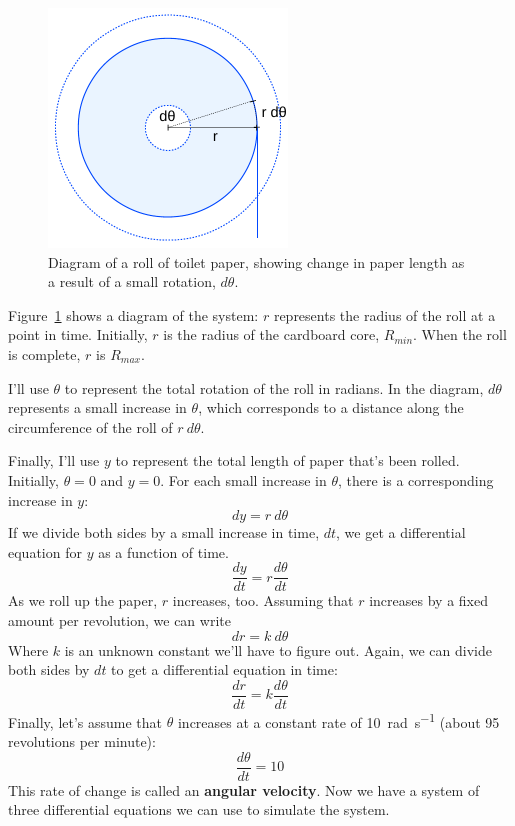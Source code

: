 \documentclass[12pt]{book}
\theoremstyle{exercise}
\begin{document}
\begin{figure}
\centerline{\includegraphics[height=2.5in]{figs/paper_roll.pdf}}
\caption{Diagram of a roll of toilet paper, showing change in paper length as a result of a small rotation, $d\theta$.}
\label{paper_roll}
\end{figure}

Figure~\ref{paper_roll} shows a diagram of the system: $r$ represents the radius of the roll at a point in time.  Initially, $r$ is the radius of the cardboard core, $R_{min}$.  When the roll is complete, $r$ is $R_{max}$.

I'll use $\theta$ to represent the total rotation of the roll in radians.  In the diagram, $d\theta$ represents a small increase in $\theta$, which corresponds to a distance along the circumference of the roll of $r~d\theta$.

Finally, I'll use $y$ to represent the total length of paper that's been rolled.  Initially, $\theta=0$ and $y=0$.  For each small increase in $\theta$, there is a corresponding increase in $y$:
%
\[ dy = r~d\theta \]
%
If we divide both sides by a small increase in time, $dt$, we get a differential equation for $y$ as a function of time.
%
\[ \frac{dy}{dt} = r \frac{d\theta}{dt} \]
%
As we roll up the paper, $r$ increases, too.  Assuming that $r$ increases by a fixed amount per revolution, we can write
%
\[ dr = k~d\theta \]
%
Where $k$ is an unknown constant we'll have to figure out.  Again, we can divide both sides by $dt$ to get a differential equation in time:
%
\[ \frac{dr}{dt} = k \frac{d\theta}{dt} \]
%
Finally, let's assume that $\theta$ increases at a constant rate of \SI{10}{\radian\per\second} (about 95 revolutions per minute):
%
\[ \frac{d\theta}{dt} = 10  \]
%
This rate of change is called an {\bf angular velocity}.  Now we have a system of three differential equations we can use to simulate the system.
\end{document}
